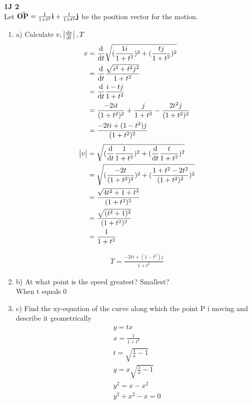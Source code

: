 \documentclass[11pt]{article}
\begin{document}
    \begin{problem}
        \textbf{1J 2}\\
        Let $\va{OP} = \frac { 1 } { 1 + t ^ { 2 } } \mathbf { i } + \frac { t } { 1 + t ^ { 2 } } \mathbf { j }$ be the position vector for the motion.
        \begin{enumerate}
            \item a) Calculate $v, \vmqty{\frac{ds}{dt}}, T $
            \begin{align*}
                v & = \dv{}{t}\sqrt{(\frac{1i}{1 + t^2})^2 + (\frac{tj}{1 + t^2})^2}\\
                & = \dv{}{t}\frac{\sqrt{i^2 + t^2j^2}}{1 + t^2} \\
                & = \dv{}{t}\frac{i - tj}{1 + t^2}\\
                & = \frac{- 2it}{(1 + t^2)^2} + \frac{j}{1 + t^2} - \frac{2t^2 j}{(1 + t^2)^2}\\
                & = \frac{- 2ti + (1 - t^2)j}{(1 + t^2)^2}
            \end{align*}
            \begin{align*}
                \vmqty{v} & = \sqrt{(\dv{}{t}\frac{1}{1 + t^2})^2 + (\dv{}{t}\frac{t}{1 + t^2})^2} \\
                & = \sqrt{(\frac{-2t}{(1 + t^2)^2})^2 + (\frac{1 + t^2 - 2t^2}{(1 + t^2)^2})^2}\\
                & = \frac{\sqrt{4t^2 + 1 + t^4}}{(1 + t^2)^2}\\
                & = \frac{\sqrt{(t^2 +1)^2}}{(1 + t^2)^2}\\
                & = \frac{1}{1 + t^2}\\
            \end{align*}

            \begin{gather*}
                T = \frac{-2ti+(1-t^2)j}{1+t^2}
            \end{gather*}
            \item b) At what point is the speed greatest? Smallest?\\
            When t equals 0\\
            \item c) Find the xy-equation of the curve along which the point P i moving and describe it geometrically
            \begin{gather*}
                y = tx\\
                x = \frac{1}{1 + t^2}\\
                t = \sqrt{\frac{1}{x} -1}\\
                y = x\sqrt{\frac{1}{x} -1}\\
                y^2 = x - x^2 \\
                y^2 + x^2 -x =0
            \end{gather*}
        \end{enumerate}
    \end{problem}
\end{document}
